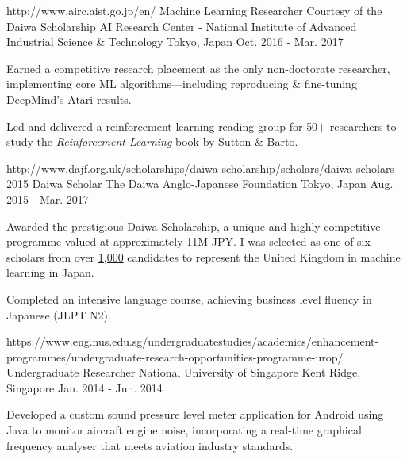 \begin{cventries}
  \cventry
    {http://www.airc.aist.go.jp/en/}
    {Machine Learning Researcher} %
    {Courtesy of the Daiwa Scholarship}
    {AI Research Center - National Institute of Advanced Industrial Science \& Technology} %
    {Tokyo, Japan} %
    {Oct. 2016 - Mar. 2017} %
    {
      \begin{cvitems} %
        \item {Earned a competitive research placement as the only non-doctorate researcher, implementing core ML algorithms—including reproducing \& fine-tuning DeepMind's Atari results.}
        \item {Led and delivered a reinforcement learning reading group for \underline{50+} researchers to study the \textit{Reinforcement Learning} book by Sutton \& Barto.}
      \end{cvitems}
    }

  \cventry
    {http://www.dajf.org.uk/scholarships/daiwa-scholarship/scholars/daiwa-scholars-2015}
    {Daiwa Scholar} %
    {}
    {The Daiwa Anglo-Japanese Foundation} %
    {Tokyo, Japan} %
    {Aug. 2015 - Mar. 2017} %
    {
      \begin{cvitems} %
        \item {Awarded the prestigious Daiwa Scholarship, a unique and highly competitive programme valued at approximately \underline{11M JPY}. I was selected as \underline{one of six} scholars from over \underline{1,000} candidates to represent the United Kingdom in machine learning in Japan.}
        \item {Completed an intensive language course, achieving business level fluency in Japanese (JLPT N2).}
      \end{cvitems}
    }

  \cventry
    {https://www.eng.nus.edu.sg/undergraduatestudies/academics/enhancement-programmes/undergraduate-research-opportunities-programme-urop/}
    {Undergraduate Researcher} %
    {}
    {National University of Singapore} %
    {Kent Ridge, Singapore} %
    {Jan. 2014 - Jun. 2014} %
    {
      \begin{cvitems} %
        \item {Developed a custom sound pressure level meter application for Android using Java to monitor aircraft engine noise, incorporating a real-time graphical frequency analyser that meets aviation industry standards.}
      \end{cvitems}
    }


\end{cventries}
